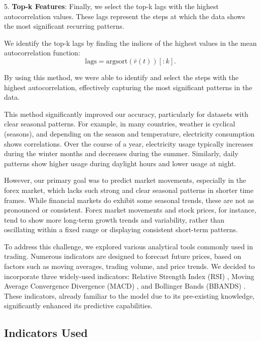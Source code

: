 5. \textbf{Top-k Features}: Finally, we select the top-k lags with the highest autocorrelation values. These lags represent the steps at which the data shows the most significant recurring patterns.

We identify the top-k lags by finding the indices of the highest values in the mean autocorrelation function:
\[
	\text{lags} = \text{argsort}(\bar{r}(t))[:\!k].
\]

By using this method, we were able to identify and select the steps with the highest autocorrelation, effectively capturing the most significant patterns in the data.

This method significantly improved our accuracy, particularly for datasets with clear seasonal patterns. For example, in many countries, weather is cyclical (seasons), and depending on the season and temperature, electricity consumption shows correlations. Over the course of a year, electricity usage typically increases during the winter months and decreases during the summer. Similarly, daily patterns show higher usage during daylight hours and lower usage at night.

However, our primary goal was to predict market movements, especially in the forex market, which lacks such strong and clear seasonal patterns in shorter time frames. While financial markets do exhibit some seasonal trends, these are not as pronounced or consistent. Forex market movements and stock prices, for instance, tend to show more long-term growth trends and variability, rather than oscillating within a fixed range or displaying consistent short-term patterns.

To address this challenge, we explored various analytical tools commonly used in trading. Numerous indicators are designed to forecast future prices, based on factors such as moving averages, trading volume, and price trends. We decided to incorporate three widely-used indicators: Relative Strength Index (RSI) \cite{rsi}, Moving Average Convergence Divergence (MACD) \cite{macd}, and Bollinger Bands (BBANDS) \cite{bbands}. These indicators, already familiar to the model due to its pre-existing knowledge, significantly enhanced its predictive capabilities.


\subsection{Indicators Used}

